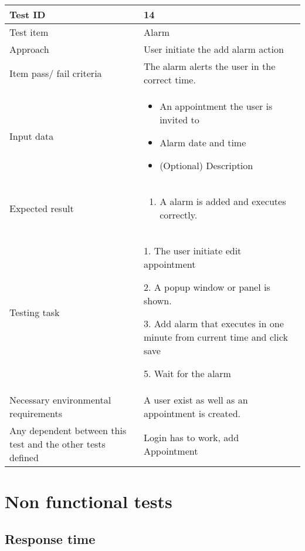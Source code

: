 \documentclass[a4paper, english, 12pt]{article}
\begin{document}
\begin{tabularx}{\textwidth}{ |X|X| }
\hline
\rowcolor{Gray}
Test ID & 14 \\ \hline
Test item & Alarm \\ \hline
Approach & User initiate the add alarm action \\ \hline
Item pass/ fail criteria & The alarm alerts the user in the correct time.\\ \hline
Input data & 
\begin{itemize}
	\item An appointment the user is invited to
	\item Alarm date and time
	\item (Optional) Description
\end{itemize}\\ \hline
Expected result & 
\begin{enumerate}
	\item A alarm is added and executes correctly.
\end{enumerate} \\ \hline
Testing task &
\begin{task steps}
	\item 1. The user initiate edit appointment
	\item 2. A popup window or panel is shown. 
	\item 3. Add alarm that executes in one minute from current time and click save
	\item 5. Wait for the alarm
\end{task steps}	\\ \hline
Necessary environmental requirements & A user exist as well as an appointment is created.   \\ \hline
Any dependent between this test and the other tests defined & Login has to work, add Appointment  \\ \hline

\end{tabularx}

\section{Non functional tests}

\subsection{Response time}
\end{document}
